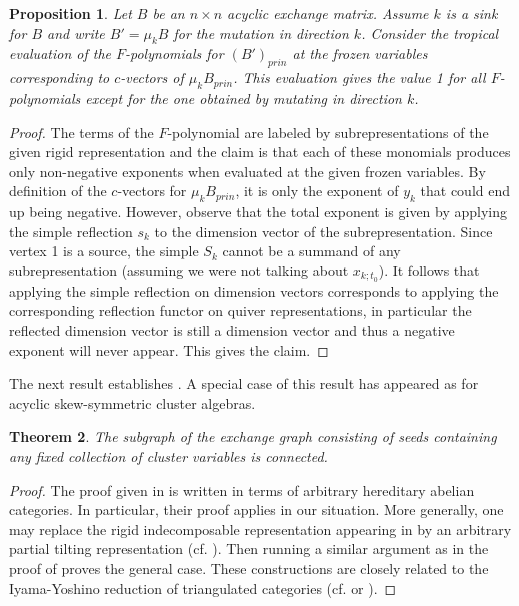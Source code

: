 \documentclass[12pt]{amsart}
\newtheorem{theorem}{Theorem}
\newtheorem{proposition}[theorem]{Proposition}
\begin{document}
  \begin{proposition}
    \label{prop:principal F-polynomials}
    Let $B$ be an $n\times n$ acyclic exchange matrix.
    Assume $k$ is a sink for $B$ and write $B'=\mu_k B$ for the mutation in direction $k$.
    Consider the tropical evaluation of the $F$-polynomials for $(B')_{prin}$ at the frozen variables corresponding to $c$-vectors of $\mu_k B_{prin}$.
    This evaluation gives the value 1 for all $F$-polynomials except for the one obtained by mutating in direction $k$.
  \end{proposition}
  \begin{proof}
    The terms of the $F$-polynomial are labeled by subrepresentations of the given rigid representation and the claim is that each of these monomials produces only non-negative exponents when evaluated at the given frozen variables.
    By definition of the $c$-vectors for $\mu_k B_{prin}$, it is only the exponent of $y_k$ that could end up being negative.
    However, observe that the total exponent is given by applying the simple reflection $s_k$ to the dimension vector of the subrepresentation.
    Since vertex 1 is a source, the simple $S_k$ cannot be a summand of any subrepresentation (assuming we were not talking about $x_{k;t_0}$).
    It follows that applying the simple reflection on dimension vectors corresponds to applying the corresponding reflection functor on quiver representations, in particular the reflected dimension vector is still a dimension vector and thus a negative exponent will never appear.
    This gives the claim.
  \end{proof}

  The next result establishes \cite[Conj. 3.9, 3.10]{reading-speyer}.
  A special case of this result has appeared as \cite[Cor. 3]{caldero-keller2} for acyclic skew-symmetric cluster algebras.
  \begin{theorem}
    The subgraph of the exchange graph consisting of seeds containing any fixed collection of cluster variables is connected.
  \end{theorem}
  \begin{proof}
    The proof given in \cite{caldero-keller2} is written in terms of arbitrary hereditary abelian categories.
    In particular, their proof applies in our situation.
    More generally, one may replace the rigid indecomposable representation appearing in \cite[Section 5.4]{caldero-keller2} by an arbitrary partial tilting representation (cf. \cite[Prop. 3]{happel-rickard-schofield}).
    Then running a similar argument as in the proof of \cite[Thm. 6]{caldero-keller2} proves the general case.
    These constructions are closely related to the Iyama-Yoshino reduction of triangulated categories (cf. \cite[Sec. 4]{iyama-yoshino} or \cite[Sec. 7.2]{keller}).
  \end{proof}
\end{document}

